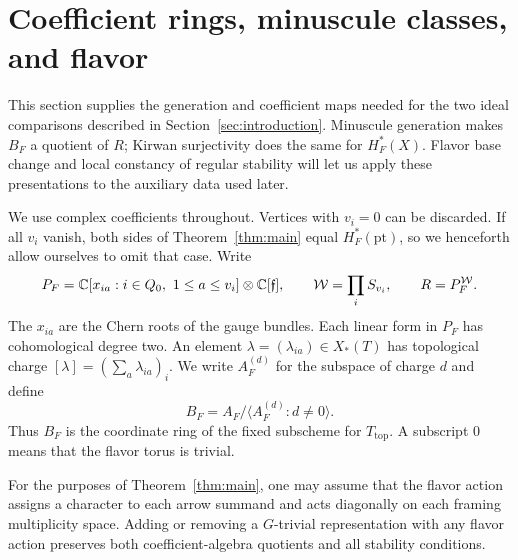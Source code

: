 \section{Coefficient rings, minuscule classes, and flavor}
\label{sec:preliminaries}

This section supplies the generation and coefficient maps needed for the
two ideal comparisons described in Section~\ref{sec:introduction}.  Minuscule
generation makes $B_F$ a quotient of $R$; Kirwan surjectivity does the same
for $H_F^*(X)$.  Flavor base change and local constancy of regular
stability will let us apply these presentations to the auxiliary data
used later.

We use complex coefficients throughout.  Vertices with $v_i=0$ can be
discarded.  If all $v_i$ vanish, both sides of Theorem~\ref{thm:main} equal
$H_F^*(\mathrm{pt})$, so we henceforth allow ourselves to omit that case.
Write
\[
 P_F=\mathbb C[x_{ia}:i\in Q_0,\ 1\le a\le v_i]\otimes\mathbb C[\mathfrak f],
 \qquad \mathcal W=\prod_i S_{v_i},\qquad R=P_F^{\mathcal W}.
\]
The $x_{ia}$ are the Chern roots of the gauge bundles.  Each linear
form in $P_F$ has cohomological degree two.  An element
$\lambda=(\lambda_{ia})\in X_*(T)$ has topological charge
$[\lambda]=(\sum_a\lambda_{ia})_i$.
We write $A_F^{(d)}$ for the subspace of charge $d$ and define
\begin{equation}\label{eq:full-fixed-quotient}
 B_F=A_F/\langle A_F^{(d)}:d\ne0\rangle.
\end{equation}
Thus $B_F$ is the coordinate ring of the fixed subscheme for
$T_{\mathrm{top}}$.  A subscript $0$ means that the flavor torus is trivial.

\begin{lemma}\label{lem:trivial-summands}
For the purposes of Theorem~\ref{thm:main}, one may assume that the flavor
action assigns a character to each arrow summand and acts diagonally on
each framing multiplicity space.  Adding or removing a $G$-trivial
representation with any flavor action preserves both coefficient-algebra
quotients and all stability conditions.
\end{lemma}

